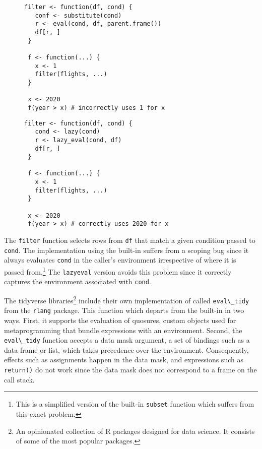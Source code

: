 \documentclass[acmsmall, screen]{acmart}
\renewcommand{\k}[1]{\lstinline |#1|\xspace}
\begin{document}
\begin{figure}[H]
  \begin{minipage}{.48\textwidth}
    \begin{lstlisting}[title={Use of R \eval},label=lst:lazyeval]
 filter <- function(df, cond) {
   conf <- substitute(cond)
   r <- eval(cond, df, parent.frame())
   df[r, ]
 }

 f <- function(...) {
   x <- 1
   filter(flights, ...)
 }

 x <- 2020
 f(year > x) # incorrectly uses 1 for x
    \end{lstlisting}
  \end{minipage}
  \begin{minipage}{.48\textwidth}
    \begin{lstlisting}[title={Use of \k{lazyeval}},label=lst:lazyeval]
 filter <- function(df, cond) {
   cond <- lazy(cond)
   r <- lazy_eval(cond, df)
   df[r, ]
 }

 f <- function(...) {
   x <- 1
   filter(flights, ...)
 }

 x <- 2020
 f(year > x) # correctly uses 2020 for x
\end{lstlisting}
\end{minipage}
\end{figure}

The \k{filter} function selects rows from \k{df} that match a given condition
passed to \k{cond}. The implementation using the built-in \eval suffers from a
scoping bug since it always evaluates \k{cond} in the caller's environment
irrespective of where it is passed from.\footnote{This is a simplified version
  of the built-in \texttt{\scriptsize subset} function which suffers from this
  exact problem.} The \k{lazyeval} version avoids this problem since it
correctly captures the environment associated with \k{cond}.

The tidyverse libraries\footnote{An opinionated collection of R packages
  designed for data science. It consists of some of the most popular packages.}
include their own implementation of \eval called \k{eval\_tidy}~\cite{tidyverse}
from the \k{rlang} package. This function which departs from the built-in \eval
in two ways. First, it supports the evaluation of quosures, custom objects used
for metaprogramming that bundle expressions with an environment. Second, the
\k{eval\_tidy} function accepts a data mask argument, a set of bindings such as
a data frame or list, which takes precedence over the environment. Consequently,
effects such as assignments happen in the data mask, and expressions such as
\k{return()} do not work since the data mask does not correspond to a frame on
the call stack.
\end{document}
